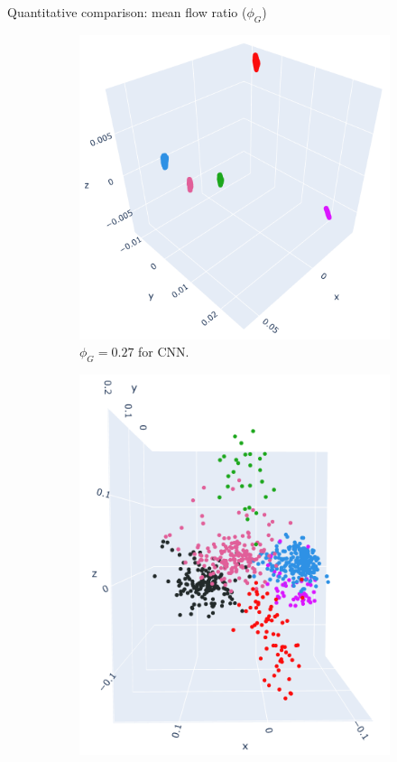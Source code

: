 \documentclass[xcolor={dvipsnames,svgnames}]{beamer}
\begin{document}
\begin{frame}{Quantitative comparison: mean flow ratio ($\phi_G$)}
\begin{figure}[H]
\centering
\begin{subfigure}[b]{0.3\textwidth}
        \includegraphics[width=\textwidth]{figures/embeddings/VGG16-2D-block1.png}
        \caption{$\phi_G = 0.27$ for CNN.}
\end{subfigure}
\hfill
\begin{subfigure}[b]{0.3\textwidth}
        \includegraphics[width=\textwidth]{figures/biological/retina-manifold.png}

\end{subfigure}
\end{figure}
\end{frame}
\end{document}
